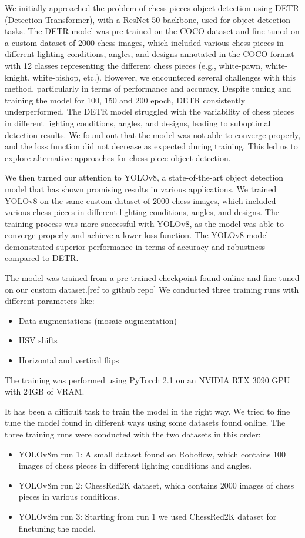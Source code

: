 We initially approached the problem of chess-pieces object detection using DETR (Detection Transformer), with a ResNet-50 backbone, used for object detection tasks.
The DETR model was pre-trained on the COCO dataset and fine-tuned on a custom dataset of 2000 chess images, which included various chess pieces in different lighting conditions,
 angles, and designs annotated in the COCO format with 12 classes representing the different chess pieces (e.g., white-pawn, white-knight, white-bishop, etc.).
However, we encountered several challenges with this method, particularly in terms of performance and accuracy.
Despite tuning and training the model for 100, 150 and 200 epoch, DETR consistently underperformed.
The DETR model struggled with the variability of chess pieces in different lighting conditions, angles, and designs, leading to suboptimal detection results.
We found out that the model was not able to converge properly, and the loss function did not decrease as expected during training.
This led us to explore alternative approaches for chess-piece object detection.

We then turned our attention to YOLOv8, a state-of-the-art object detection model that has shown promising results in various applications.
We trained YOLOv8 on the same custom dataset of 2000 chess images, which included various chess pieces in different lighting conditions, angles, and designs.
The training process was more successful with YOLOv8, as the model was able to converge properly and achieve a lower loss function.
The YOLOv8 model demonstrated superior performance in terms of accuracy and robustness compared to DETR.

The model was trained from a pre-trained checkpoint found online and fine-tuned on our custom dataset.[ref to github repo]
We conducted three training runs with different parameters like:
\begin{itemize}
    \item Data augmentations (mosaic augmentation)
    \item HSV shifts
    \item Horizontal and vertical flips
\end{itemize}
The training was performed using PyTorch 2.1 on an NVIDIA RTX 3090 GPU with 24GB of VRAM.

It has been a difficult task to train the model in the right way.
We tried to fine tune the model found in different ways using some datasets found online.
The three training runs were conducted with the two datasets in this order:
\begin{itemize}
    \item YOLOv8m run 1: A small dataset found on Roboflow, which contains 100 images of chess pieces in different lighting conditions and angles.
    \item YOLOv8m run 2: ChessRed2K dataset, which contains 2000 images of chess pieces in various conditions.
    \item YOLOv8m run 3: Starting from run 1 we used ChessRed2K dataset for finetuning the model.
\end{itemize}


